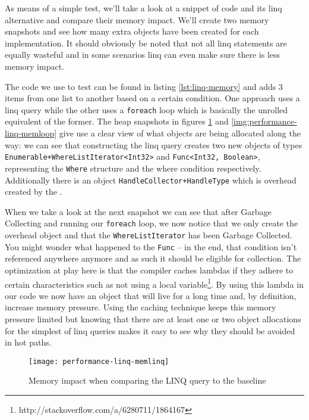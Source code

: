 \newpage

As means of a simple test, we'll take a look at a snippet of code and its \gls{linq} alternative and compare their memory impact. We'll create two memory snapshots and see how many extra objects have been created for each implementation. It should obviously be noted that not all \gls{linq} statements are equally wasteful and in some scenarios \gls{linq} can even make sure there is less memory impact.

The code we use to test can be found in listing \ref{lst:linq-memory} and adds 3 items from one list to another based on a certain condition. One approach uses a \gls{linq} query while the other uses a \texttt{foreach} loop which is basically the unrolled equivalent of the former. The heap snapshots in figures \ref{img:performance-linq-memlinq} and \ref{img:performance-linq-memloop} give use a clear view of what objects are being allocated along the way: we can see that constructing the \gls{linq} query creates two new objects of types \texttt{Enumerable+WhereListIterator<Int32>} and \texttt{Func<Int32, Boolean>}, representing the \texttt{Where} structure and the where condition respectively. Additionally there is an object \texttt{HandleCollector+HandleType} which is overhead created by the . 

When we take a look at the next snapshot we can see that after Garbage Collecting and running our \texttt{foreach} loop, we now notice that we only create the overhead object and that the \texttt{WhereListIterator} has been Garbage Collected. You might wonder what happened to the \texttt{Func} -- in the end, that condition isn't referenced anywhere anymore and as such it should be eligible for collection. The optimization at play here is that the \gls{compiler} caches lambdas if they adhere to certain characteristics such as not using a local variable\footnote{http://stackoverflow.com/a/6280711/1864167}. By using this lambda in our code we now have an object that will live for a long time and, by definition, increase memory pressure. Using the caching technique keeps this memory pressure limited but knowing that there are at least one or two object allocations for the simplest of \gls{linq} queries makes it easy to see why they should be avoided in hot paths.


\begin{figure}
\centering
\texttt{[image: performance-linq-memlinq]}
\caption{Memory impact when comparing the LINQ query to the baseline}
\label{img:performance-linq-memlinq}
\end{figure}

